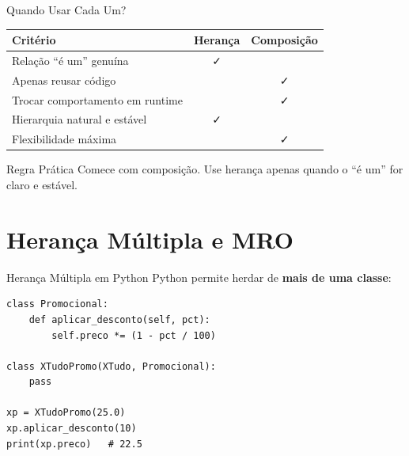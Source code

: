 \documentclass[aspectratio=169]{beamer}
\begin{document}
\begin{frame}{Quando Usar Cada Um?}
  \begin{center}
    \begin{tabular}{lcc}
      \toprule
      \textbf{Critério} & \textbf{Herança} & \textbf{Composição} \\
      \midrule
      Relação ``é um'' genuína & ✓ & \\
      Apenas reusar código     &   & ✓ \\
      Trocar comportamento em runtime & & ✓ \\
      Hierarquia natural e estável & ✓ & \\
      Flexibilidade máxima & & ✓ \\
      \bottomrule
    \end{tabular}
  \end{center}

  \begin{alertblock}{Regra Prática}
    Comece com composição. Use herança apenas quando o ``é um'' for claro e estável.
  \end{alertblock}
\end{frame}

\section{Herança Múltipla e MRO}

\begin{frame}[fragile]{Herança Múltipla em Python}
  Python permite herdar de \textbf{mais de uma classe}:

  \begin{lstlisting}
class Promocional:
    def aplicar_desconto(self, pct):
        self.preco *= (1 - pct / 100)

class XTudoPromo(XTudo, Promocional):
    pass

xp = XTudoPromo(25.0)
xp.aplicar_desconto(10)
print(xp.preco)   # 22.5
  \end{lstlisting}
\end{frame}
\end{document}
